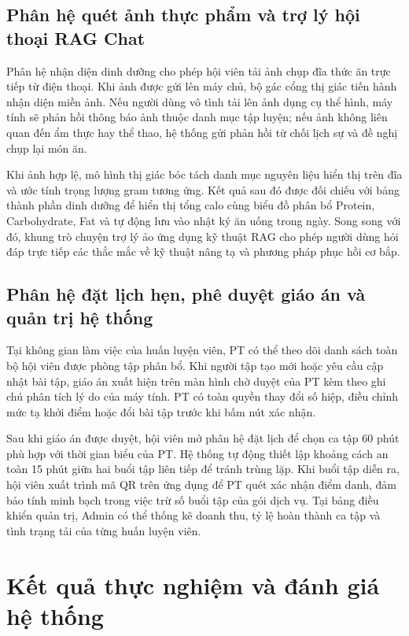 \subsection{Phân hệ quét ảnh thực phẩm và trợ lý hội thoại RAG Chat}
\label{subsec:impl_vision_rag}

Phân hệ nhận diện dinh dưỡng cho phép hội viên tải ảnh chụp đĩa thức ăn trực tiếp từ điện thoại. Khi ảnh được gửi lên máy chủ, bộ gác cổng thị giác tiến hành nhận diện miền ảnh. Nếu người dùng vô tình tải lên ảnh dụng cụ thể hình, máy tính sẽ phản hồi thông báo ảnh thuộc danh mục tập luyện; nếu ảnh không liên quan đến ẩm thực hay thể thao, hệ thống gửi phản hồi từ chối lịch sự và đề nghị chụp lại món ăn.

Khi ảnh hợp lệ, mô hình thị giác bóc tách danh mục nguyên liệu hiển thị trên đĩa và ước tính trọng lượng gram tương ứng. Kết quả sau đó được đối chiếu với bảng thành phần dinh dưỡng để hiển thị tổng calo cùng biểu đồ phân bổ Protein, Carbohydrate, Fat và tự động lưu vào nhật ký ăn uống trong ngày. Song song với đó, khung trò chuyện trợ lý ảo ứng dụng kỹ thuật RAG cho phép người dùng hỏi đáp trực tiếp các thắc mắc về kỹ thuật nâng tạ và phương pháp phục hồi cơ bắp.

\subsection{Phân hệ đặt lịch hẹn, phê duyệt giáo án và quản trị hệ thống}
\label{subsec:impl_pt_admin}

Tại không gian làm việc của huấn luyện viên, PT có thể theo dõi danh sách toàn bộ hội viên được phòng tập phân bổ. Khi người tập tạo mới hoặc yêu cầu cập nhật bài tập, giáo án xuất hiện trên màn hình chờ duyệt của PT kèm theo ghi chú phân tích lý do của máy tính. PT có toàn quyền thay đổi số hiệp, điều chỉnh mức tạ khởi điểm hoặc đổi bài tập trước khi bấm nút xác nhận.

Sau khi giáo án được duyệt, hội viên mở phân hệ đặt lịch để chọn ca tập 60 phút phù hợp với thời gian biểu của PT. Hệ thống tự động thiết lập khoảng cách an toàn 15 phút giữa hai buổi tập liên tiếp để tránh trùng lặp. Khi buổi tập diễn ra, hội viên xuất trình mã QR trên ứng dụng để PT quét xác nhận điểm danh, đảm bảo tính minh bạch trong việc trừ số buổi tập của gói dịch vụ. Tại bảng điều khiển quản trị, Admin có thể thống kê doanh thu, tỷ lệ hoàn thành ca tập và tình trạng tải của từng huấn luyện viên.

\section{Kết quả thực nghiệm và đánh giá hệ thống}
\label{sec:ketqua_danhgia}

